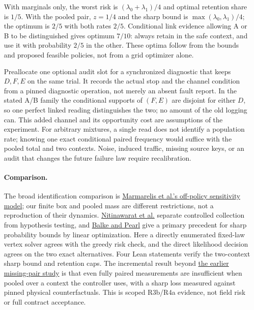 \documentclass[11pt]{article}
\begin{document}
With marginals only, the worst risk is $(\lambda_0+\lambda_1)/4$ and optimal retention share is $1/5$. With the pooled pair, $z=1/4$ and the sharp bound is $\max(\lambda_0,\lambda_1)/4$; the optimum is $2/5$ with both rates $2/5$. Conditional link evidence allowing A or B to be distinguished gives optimum $7/10$: always retain in the safe context, and use it with probability $2/5$ in the other. These optima follow from the bounds and proposed feasible policies, not from a grid optimizer alone.

Preallocate one optional audit slot for a synchronized diagnostic that keeps $D,F,E$ on the same trial. It records the actual stop and the channel condition from a pinned diagnostic operation, not merely an absent fault report. In the stated A/B family the conditional supports of $(F,E)$ are disjoint for either $D$, so one perfect linked reading distinguishes the two; no amount of the old logging can. This added channel and its opportunity cost are assumptions of the experiment. For arbitrary mixtures, a single read does not identify a population rate; knowing one exact conditional paired frequency would suffice with the pooled total and two contexts. Noise, induced traffic, missing source keys, or an audit that changes the future failure law require recalibration.

\paragraph{Comparison.}
The broad identification comparison is \href{https://proceedings.mlr.press/v286/marmarelis25a.html}{Marmarelis et al.'s off-policy sensitivity model}; our finite box and pooled mass are different restrictions, not a reproduction of their dynamics. \href{https://arxiv.org/abs/1205.0858}{Nitinawarat et al.} separate controlled collection from hypothesis testing, and \href{https://ftp.cs.ucla.edu/pub/stat_ser/r199-jasa.pdf}{Balke and Pearl} give a primary precedent for sharp probability bounds by linear optimization. Here a directly enumerated fixed-law vertex solver agrees with the greedy risk check, and the direct likelihood decision agrees on the two exact alternatives. Four Lean statements verify the two-context sharp bound and retention caps. The incremental result beyond \href{https://github.com/eternal-november/eos-research-programmes/pull/398}{the earlier missing-pair study} is that even fully paired measurements are insufficient when pooled over a context the controller uses, with a sharp loss measured against pinned physical counterfactuals. This is scoped R3b/R4a evidence, not field risk or full contract acceptance.
\end{document}
